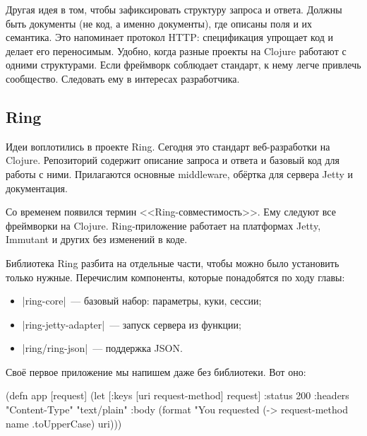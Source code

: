 Другая идея в том, чтобы зафиксировать структуру запроса и ответа. Должны быть
документы (не код, а именно документы), где описаны поля и их семантика. Это
напоминает протокол HTTP: спецификация упрощает код и делает его
переносимым. Удобно, когда разные проекты на Clojure работают с одними
структурами. Если фреймворк соблюдает стандарт, к нему легче привлечь
сообщество. Следовать ему в интересах разработчика.

\subsection{Ring}

\label{ring-jetty}

Идеи воплотились в проекте Ring.
Сегодня это стандарт веб-разработки на Clojure. Репозиторий содержит описание
запроса и ответа и базовый код для работы с ними. Прилагаются основные middleware,
об\"{е}ртка для сервера Jetty и документация.


Со временем появился термин <<Ring-совместимость>>. Ему следуют все фреймворки
на Clojure. Ring-приложение работает на платформах Jetty, Immutant и других без
изменений в коде.

Библиотека Ring разбита на отдельные части, чтобы можно было установить только
нужные. Перечислим компоненты, которые понадобятся по ходу главы:

\begin{itemize}

\item
  \spverb|ring-core|~--- базовый набор: параметры, куки, сессии;

\item
  \spverb|ring-jetty-adapter|~--- запуск сервера из функции;

\item
  \spverb|ring/ring-json|~--- поддержка JSON.

\end{itemize}

Сво\"{е} первое приложение мы напишем даже без библиотеки. Вот оно:


\label{first-handler}

\begin{english}
  \begin{clojure}
(defn app [request]
  (let [{:keys [uri request-method]} request]
    {:status 200
     :headers {"Content-Type" "text/plain"}
     :body (format "You requested %
                   (-> request-method name .toUpperCase)
                   uri)}))
  \end{clojure}
\end{english}

